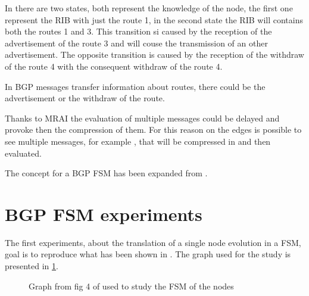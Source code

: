 In  there are two states, both represent the knowledge of
the node, the first one represent the \ac{RIB} with just the route \num{1}, in
the second state the \ac{RIB} will contains both the routes \num{1} and \num{3}.
This transition si caused by the reception of the advertisement of the route 
\num{3} and will couse the transmission of an other advertisement.
The opposite transition is caused by the reception of the withdraw of the route
\num{4} with the consequent withdraw of the route \num{4}.

In \ac{BGP} messages transfer information about routes, there could be the advertisement
or the withdraw of the route.

Thanks to \ac{MRAI} the evaluation of multiple messages could be delayed and
provoke then the compression of them.
For this reason on the edges is possible to see multiple messages, for example 
, that will be compressed in  and then evaluated.

The concept for a \ac{BGP} \ac{FSM} has been expanded from \cite{griffinFSM}.


\section{BGP FSM experiments}
\label{sec:bgp_fsm_experiments}

The first experiments, about the translation of a single node evolution in a
\ac{FSM}, goal is to reproduce what has been shown in \cite{griffinFSM}.
The graph used for the study is presented in \cref{fig:griffin_fig_4}.

\begin{figure}[h]                                                               
    \begin{center}                                                              
        
    \end{center}                                                                
	\caption{Graph from fig 4 of \cite{griffinFSM} used to study the \ac{FSM}
		of the nodes}                                
    \label{fig:griffin_fig_4}                                                   
\end{figure}

